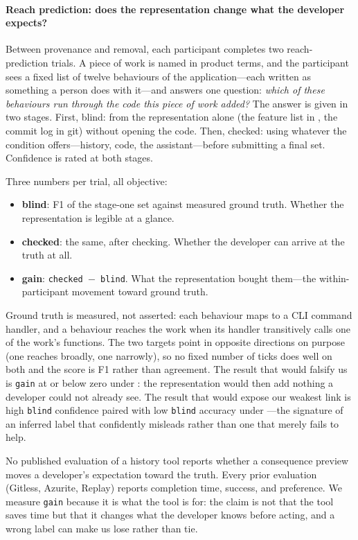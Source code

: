 \paragraph{Reach prediction: does the representation change what the developer
expects?}
Between provenance and removal, each participant completes two reach-prediction
trials. A piece of work is named in product terms, and the participant sees a
fixed list of twelve behaviours of the application---each written as something a
person does with it---and answers one question: \emph{which of these behaviours
run through the code this piece of work added?} The answer is given in two
stages. First, blind: from the representation alone (the feature list in
\sgt{}, the commit log in git) without opening the code. Then, checked: using
whatever the condition offers---history, code, the assistant---before submitting
a final set. Confidence is rated at both stages.

Three numbers per trial, all objective:
\begin{itemize}
\item \textbf{blind}: F1 of the stage-one set against measured ground truth.
  Whether the representation is legible at a glance.
\item \textbf{checked}: the same, after checking. Whether the developer can
  arrive at the truth at all.
\item \textbf{gain}: \texttt{checked $-$ blind}. What the representation bought
  them---the within-participant movement toward ground truth.
\end{itemize}

\noindent Ground truth is measured, not asserted: each behaviour maps to a CLI
command handler, and a behaviour reaches the work when its handler transitively
calls one of the work's functions. The two targets point in opposite directions
on purpose (one reaches broadly, one narrowly), so no fixed number of ticks does
well on both and the score is F1 rather than agreement. The result that would
falsify us is \texttt{gain} at or below zero under \sgt{}: the representation
would then add nothing a developer could not already see. The result that would
expose our weakest link is high \texttt{blind} confidence paired with low
\texttt{blind} accuracy under \sgt{}---the signature of an inferred label that
confidently misleads rather than one that merely fails to help.

No published evaluation of a history tool reports whether a consequence
preview moves a developer's expectation toward the truth. Every prior evaluation
(Gitless, Azurite, Replay) reports completion time, success, and preference.
We measure \texttt{gain} because it is what the tool is for: the claim is not
that the tool saves time but that it changes what the developer knows before
acting, and a wrong label can make us lose rather than tie.

